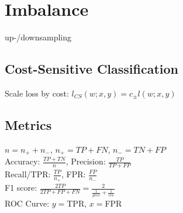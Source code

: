 \section*{Imbalance}

up-/downsampling

\subsection*{Cost-Sensitive Classification}
Scale loss by cost: $l_{CS}(w;x,y) = c_\pm l(w;x,y)$

\subsection*{Metrics}
$n = n_+ + n_-$, $n_+ = TP + FN$, $n_- = TN + FP$\\
Accuracy: $\frac{TP+TN}{n}$, 
Precision: $\frac{TP}{TP+FP}$\\ 
Recall/TPR: $\frac{TP}{n_+}$, 
FPR: $ \frac{FP}{n_-}$\\
F1 score: $\frac{2TP}{2TP+FP+FN} = \frac{2}{\frac{1}{prec} + \frac{1}{rec}}$\\
ROC Curve: $y = $TPR, $x = $FPR